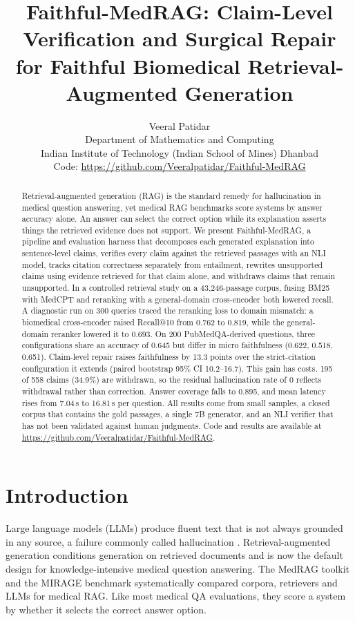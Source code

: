 \documentclass[11pt]{article}
\title{Faithful-MedRAG: Claim-Level Verification and Surgical Repair\\for Faithful Biomedical Retrieval-Augmented Generation}
\author{Veeral Patidar \\
  Department of Mathematics and Computing \\
  Indian Institute of Technology (Indian School of Mines) Dhanbad \\
  \small Code: \url{https://github.com/Veeralpatidar/Faithful-MedRAG} }
\begin{document}
\sloppy
\maketitle

\begin{abstract}
Retrieval-augmented generation (RAG) is the standard remedy for hallucination in medical question answering, yet medical RAG benchmarks score systems by answer accuracy alone. An answer can select the correct option while its explanation asserts things the retrieved evidence does not support. We present Faithful-MedRAG, a pipeline and evaluation harness that decomposes each generated explanation into sentence-level claims, verifies every claim against the retrieved passages with an NLI model, tracks citation correctness separately from entailment, rewrites unsupported claims using evidence retrieved for that claim alone, and withdraws claims that remain unsupported. In a controlled retrieval study on a 43,246-passage corpus, fusing BM25 with MedCPT and reranking with a general-domain cross-encoder both lowered recall. A diagnostic run on 300 queries traced the reranking loss to domain mismatch: a biomedical cross-encoder raised Recall@10 from 0.762 to 0.819, while the general-domain reranker lowered it to 0.693. On 200 PubMedQA-derived questions, three configurations share an accuracy of 0.645 but differ in micro faithfulness (0.622, 0.518, 0.651). Claim-level repair raises faithfulness by 13.3 points over the strict-citation configuration it extends (paired bootstrap 95\% CI 10.2--16.7). This gain has costs. 195 of 558 claims (34.9\%) are withdrawn, so the residual hallucination rate of 0 reflects withdrawal rather than correction. Answer coverage falls to 0.895, and mean latency rises from 7.04\,s to 16.81\,s per question. All results come from small samples, a closed corpus that contains the gold passages, a single 7B generator, and an NLI verifier that has not been validated against human judgments. Code and results are available at \url{https://github.com/Veeralpatidar/Faithful-MedRAG}.
\end{abstract}

\section{Introduction}
Large language models (LLMs) produce fluent text that is not always grounded in any source, a failure commonly called hallucination \citep{ji2023survey}. Retrieval-augmented generation \citep[RAG;][]{lewis2020rag} conditions generation on retrieved documents and is now the default design for knowledge-intensive medical question answering. The MedRAG toolkit and the MIRAGE benchmark \citep{xiong2024benchmarking} systematically compared corpora, retrievers and LLMs for medical RAG. Like most medical QA evaluations, they score a system by whether it selects the correct answer option.
\end{document}
